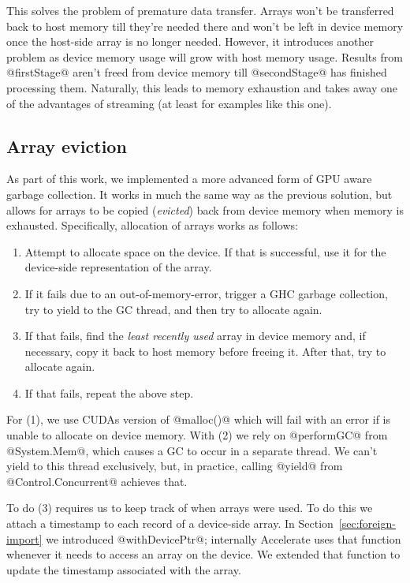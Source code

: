 This solves the problem of premature data transfer. Arrays won't be transferred back to host memory till they're needed there and won't be left in device memory once the host-side array is no longer needed. However, it introduces another problem as device memory usage will grow with host memory usage. Results from @firstStage@ aren't freed from device memory till @secondStage@ has finished processing them. Naturally, this leads to memory exhaustion and takes away one of the advantages of streaming (at least for examples like this one).

\subsection{Array eviction}

As part of this work, we implemented a more advanced form of GPU aware garbage collection. It works in much the same way as the previous solution, but allows for arrays to be copied (\emph{evicted}) back from device memory when memory is exhausted. Specifically, allocation of arrays works as follows:
%
\begin{enumerate}
\item Attempt to allocate space on the device. If that is successful, use it for the device-side representation of the array.
\item If it fails due to an out-of-memory-error, trigger a GHC garbage collection, try to yield to the GC thread, and then try to allocate again.
\item If that fails, find the \emph{least recently used} array in device memory and, if necessary, copy it back to host memory before freeing it. After that, try to allocate again.
\item If that fails, repeat the above step.
\end{enumerate}
%
For (1), we use CUDAs version of @malloc()@ which will fail with an error if is unable to allocate on device memory. With (2) we rely on @performGC@ from @System.Mem@, which causes a GC to occur in a separate thread. We can't yield to this thread exclusively, but, in practice, calling @yield@ from @Control.Concurrent@ achieves that.

To do (3) requires us to keep track of when arrays were used. To do this we attach a timestamp to each record of a device-side array. In Section~\ref{sec:foreign-import} we introduced @withDevicePtr@; internally Accelerate uses that function whenever it needs to access an array on the device. We extended that function to update the timestamp associated with the array.

